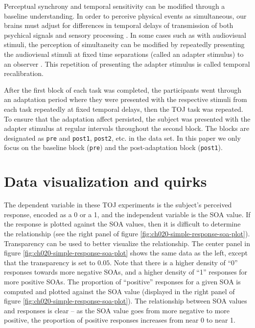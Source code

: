 \documentclass[11pt, oneside, openany]{scrbook}
\begin{document}
Perceptual synchrony and temporal sensitivity can be modified through a baseline understanding. In order to perceive physical events as simultaneous, our brains must adjust for differences in temporal delays of transmission of both psychical signals and sensory processing \citep{fujisaki2004recalibration}. In some cases such as with audiovisual stimuli, the perception of simultaneity can be modified by repeatedly presenting the audiovisual stimuli at fixed time separations (called an adapter stimulus) to an observer \citep{vroomen2004recalibration}. This repetition of presenting the adapter stimulus is called temporal recalibration.

After the first block of each task was completed, the participants went through an adaptation period where they were presented with the respective stimuli from each task repeatedly at fixed temporal delays, then the TOJ task was repeated. To ensure that the adaptation affect persisted, the subject was presented with the adapter stimulus at regular intervals throughout the second block. The blocks are designated as \texttt{pre} and \texttt{post1}, \texttt{post2}, etc. in the data set. In this paper we only focus on the baseline block (\texttt{pre}) and the post-adaptation block (\texttt{post1}).

\hypertarget{data-visualization-and-quirks}{%
\section{Data visualization and quirks}\label{data-visualization-and-quirks}}

The dependent variable in these TOJ experiments is the subject's perceived response, encoded as a 0 or a 1, and the independent variable is the SOA value. If the response is plotted against the SOA values, then it is difficult to determine the relationship (see the right panel of figure \ref{fig:ch020-simple-response-soa-plot}). Transparency can be used to better visualize the relationship. The center panel in figure \ref{fig:ch020-simple-response-soa-plot} shows the same data as the left, except that the transparency is set to \(0.05\). Note that there is a higher density of ``0'' responses towards more negative SOAs, and a higher density of ``1'' responses for more positive SOAs. The proportion of ``positive'' responses for a given SOA is computed and plotted against the SOA value (displayed in the right panel of figure \ref{fig:ch020-simple-response-soa-plot}). The relationship between SOA values and responses is clear -- as the SOA value goes from more negative to more positive, the proportion of positive responses increases from near 0 to near 1.
\end{document}
